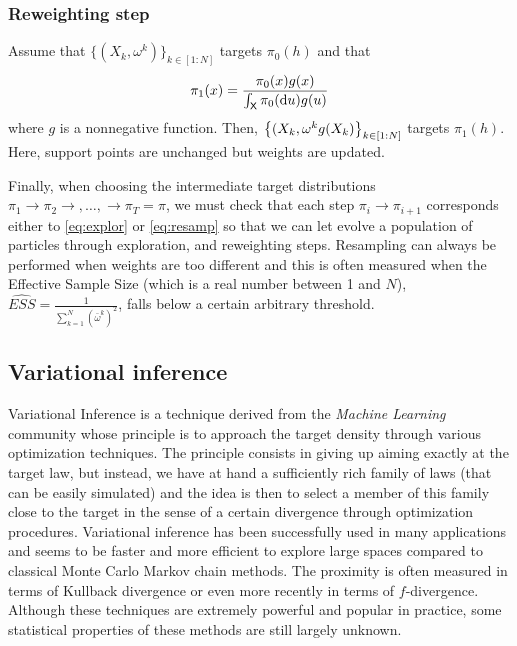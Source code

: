 \documentclass[english,graybox,envcountchap,envcountsame,sectrefs,shortlabels]{svmono}
\theoremstyle{style}
\begin{document}
\subsubsection{Reweighting step}
Assume that $\{(X_k,\omega^k)\}_{k\in[1:N]}$ targets $\pi_0(h)$ and that
\begin{equation} \label{eq:resamp}
\pi_1(x)=\frac{ \pi_0(x) g(x) }{\int_{\mathsf{X}} \pi_0(\mathrm{d} u) g(u) }
\end{equation}
where $g$ is a nonnegative function. Then,  $\left\{ (X_k,\omega^k g(X_k) \right\}_{k\in[1:N]}$ targets $\pi_1(h)$. Here, support points are unchanged but weights are updated.

Finally, when choosing the intermediate target distributions $\pi_1\rightarrow \pi_2\rightarrow,\ldots,\rightarrow \pi_T=\pi$, we must check that each step $\pi_i \rightarrow \pi_{i+1}$ corresponds either to \eqref{eq:explor} or \eqref{eq:resamp} so that we can let evolve a population of particles through exploration, and reweighting steps. Resampling can always be performed when weights are too different and this is often measured when the Effective Sample Size (which is a real number between 1 and $N$), $\widehat{ESS}=\frac{1}{\sum_{k=1}^N (\bar \omega^k)^2}$, falls below a certain arbitrary threshold.
\subsection{Variational inference}
Variational Inference is a technique derived from the
 {\em Machine Learning} community whose principle is to approach the target density through various optimization techniques. The principle consists in giving up aiming exactly at the target law, but instead, we have at hand a sufficiently rich family of laws (that can be easily simulated) and the idea is then to select a member of this family close to the target in the sense of a certain divergence through optimization procedures. Variational inference has been successfully used in many applications and seems to be faster and more efficient to explore large spaces compared to classical Monte Carlo Markov chain methods. The proximity is often measured in terms of Kullback divergence or even more recently in terms of $f$-divergence. Although these techniques are extremely powerful and popular in practice, some statistical properties of these methods are still largely unknown.
\end{document}
